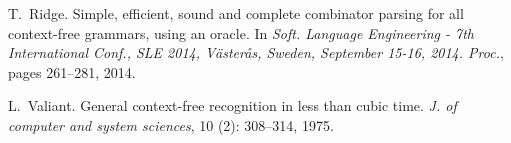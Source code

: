 \documentclass{CSML}
\numberwithin{theorem}{section}
\begin{document}
\begin{thebibliography}{21}
T.~Ridge.
\newblock Simple, efficient, sound and complete combinator parsing for all
  context-free grammars, using an oracle.
\newblock In \emph{Soft. Language Engineering - 7th International Conf., {SLE}
  2014, V{\"{a}}ster{\aa}s, Sweden, September 15-16, 2014. Proc.}, pages
  261--281, 2014.

L.~Valiant.
\newblock General context-free recognition in less than cubic time.
\newblock \emph{J. of computer and system sciences}, 10 (2):
  308--314, 1975.

\end{thebibliography}
\end{document}
